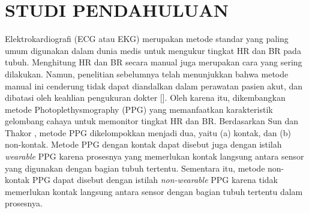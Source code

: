 
\chapter{STUDI PENDAHULUAN}

\ifpdf
    \graphicspath{{Chapter2/Figs/Raster/}{Chapter2/Figs/PDF/}{Chapter2/Figs/}}
\else
    \graphicspath{{Chapter2/Figs/Vector/}{Chapter2/Figs/}}
\fi

Elektrokardiografi (ECG atau EKG) merupakan metode standar yang paling umum digunakan dalam dunia medis untuk mengukur tingkat HR dan BR pada tubuh. Menghitung HR dan BR secara manual juga merupakan cara yang sering dilakukan. Namun, penelitian sebelumnya telah menunjukkan bahwa metode manual ini cenderung tidak dapat diandalkan dalam perawatan pasien akut, dan dibatasi oleh keahlian pengukuran dokter [\citet{hillman2005}]. Oleh karena itu, dikembangkan metode Photoplethysmography (PPG) yang memanfaatkan karakteristik gelombang cahaya untuk memonitor tingkat HR dan BR. Berdasarkan Sun dan Thakor \citep{sun2016}, metode PPG dikelompokkan menjadi dua, yaitu (a) kontak, dan (b) non-kontak. Metode PPG dengan kontak dapat disebut juga dengan istilah \textit{wearable} PPG karena prosesnya yang memerlukan kontak langsung antara sensor yang digunakan dengan bagian tubuh tertentu. Sementara itu, metode non-kontak PPG dapat disebut dengan istilah \textit{non-wearable} PPG karena tidak memerlukan kontak langsung antara sensor dengan bagian tubuh tertentu dalam prosesnya. 




